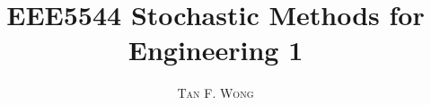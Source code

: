 \documentclass[a4paper,11pt,oneside]{book}
\title{\Huge \textbf{EEE5544 Stochastic Methods for Engineering 1}}
\author{\textsc{Tan F. Wong}}
\begin{document}
\sloppy

\frontmatter
\maketitle

\tableofcontents

\mainmatter

% 
% 




\end{document}
